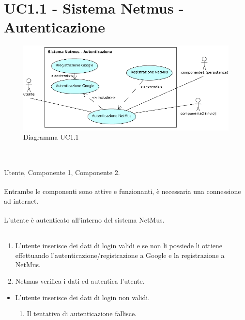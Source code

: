 \section{UC1.1 - Sistema Netmus - Autenticazione}
\begin{figure}[h]
  \centering
  \includegraphics[width=15cm]{img/AR/UC1_1.png}
\caption{Diagramma UC1.1}
\end{figure}

\vspace{1cm}
\\\\
 Utente, Componente 1, Componente 2. \\\\
 Entrambe le componenti sono attive e funzionanti, \`e
necessaria una connessione ad internet. \\\\ 
 L'utente \`e autenticato all'interno del sistema NetMus. \\\\
\begin{enumerate}
  \item L'utente inserisce dei dati di login validi e se non li possiede
  li ottiene effettuando l'autenticazione/registrazione a Google e la
  registrazione a NetMus.
  \item Netmus verifica i dati ed autentica l'utente.
\end{enumerate}
\begin{itemize}
  \item L'utente inserisce dei dati di login non validi.
  \begin {enumerate}
    \item Il tentativo di autenticazione fallisce.
  \end{enumerate}
\end{itemize}
\newpage


